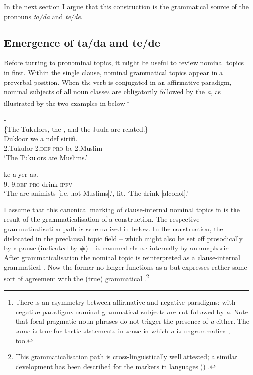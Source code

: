 \documentclass[output=paper
,newtxmath
,modfonts
,nonflat]{langsci/langscibook}
\begin{document}
In the next section I argue that this construction is the grammatical source of the pronouns \textit{ta/da} and \textit{te/de}.

\subsection{Emergence of ta/da and te/de}\label{sec:apel:2.2}

Before turning to pronominal  topics, it might be useful to review nominal  topics in  first. Within the single clause, nominal grammatical  topics appear in a preverbal position. When the verb is conjugated in an affirmative paradigm, nominal subjects of all noun classes are obligatorily followed by the  \textit{a}, as illustrated by the two examples in  below.\footnote{There is an asymmetry between affirmative and negative paradigms: with negative paradigms nominal grammatical subjects are not followed by \textit{a}. Note that focal pragmatic  noun phrases do not trigger the presence of \textit{a} either. The same is true for thetic statements in  sense in which \textit{a} is ungrammatical, too.}

\ea\label{ex:apel:12}{- \citep[289]{Faye1979}}\\
\{The Tukulors, the , and the Juula are related.\}\\
\ea\label{ex:apel:12a}
\gll Dukloor we a ndef siriiñ.\\
     \textsc{2.}Tukulor \textsc{2.def} \textsc{pro} be \textsc{2.}Muslim\\
\glt ‘The Tukulors are Muslims.’

\ex\label{ex:apel:12b}
\gll {} ke a yer-aa.\\
     \textsc{9.} \textsc{9.def} \textsc{pro} drink\textsc{-ipfv}\\
\glt ‘The  are animists [i.e. not Muslims].’, lit. ‘The  drink [alcohol].’
\z
\z

I assume that this canonical marking of clause-internal nominal  topics in  is the result of the grammaticalisation of a  construction. The respective grammaticalisation path is schematised in  below. In the  construction, the dislocated  in the preclausal topic field -- which might also be set off prosodically by a pause (indicated by \#) -- is resumed clause-internally by an anaphoric . After grammaticalisation the nominal topic is reinterpreted as a clause-internal grammatical . Now the former  no longer functions as a  but expresses rather some sort of agreement with the (true) grammatical .\footnote{This grammaticalisation path is cross-linguistically well attested; a similar development has been described for the  markers in  languages () \citep{Morimoto2008}.}
\end{document}
